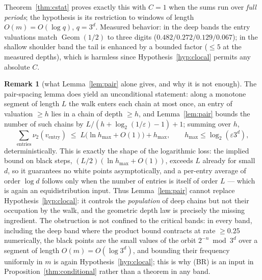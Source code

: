\documentclass[11pt]{article}
\theoremstyle{definition}
\newtheorem{remark}[theorem]{Remark}
\DeclareMathOperator{\Geom}{Geom}
\begin{document}
Theorem~\ref{thm:cstat} proves exactly this with $C=1$ when the sums
run over \emph{full periods}; the hypothesis is its restriction to
windows of length $O(m)=O(\log q)$, $q=3^d$. Measured behavior: in the
deep bands the entry valuations match $\Geom(1/2)$ to three digits
($0.482/0.272/0.129/0.067$); in the shallow shoulder band the tail is
enhanced by a bounded factor ($\le 5$ at the measured depths), which is
harmless since Hypothesis~\ref{hyp:clocal} permits any absolute $C$.

\begin{remark}[what Lemma~\ref{lem:pair} alone gives, and why it is not enough]
\label{rem:pairalone}
The pair-spacing lemma does yield an unconditional statement: along a
monotone segment of length $L$ the walk enters each chain at most once,
an entry of valuation $\ge h$ lies in a chain of depth $\ge h$, and
Lemma~\ref{lem:pair} bounds the number of such chains by
$L/(h+\log_2(1/\varepsilon)-1)+1$; summing over $h$,
\[
\sum_{\text{entries}}\nu_2(v_{\mathrm{entry}})\;\le\;
L\bigl(\ln h_{\max}+O(1)\bigr)+h_{\max},
\qquad h_{\max}\le\log_2(\varepsilon 3^d),
\]
deterministically. This is exactly the shape of the logarithmic loss:
the implied bound on black steps, $(L/2)(\ln h_{\max}+O(1))$,
exceeds $L$ already for small $d$, so it guarantees no white points
asymptotically, and a per-entry average of order $\log d$ follows only
when the number of entries is itself of order $L$ --- which is again an
equidistribution input. Thus Lemma~\ref{lem:pair} cannot replace
Hypothesis~\ref{hyp:clocal}: it controls the \emph{population} of deep
chains but not their occupation by the walk, and the geometric depth law
is precisely the missing ingredient. The obstruction is not confined to
the critical bands: in every band, including the deep band where the
product bound contracts at rate $\ge 0.25$ numerically, the black points
are the small values of the orbit $2^{-n}\bmod 3^d$ over a segment of
length $O(m)=O(\log 3^d)$, and bounding their frequency uniformly in $m$
is again Hypothesis~\ref{hyp:clocal}; this is why (BR) is an input in
Proposition~\ref{thm:conditional} rather than a theorem in any band.
\end{remark}
\end{document}
